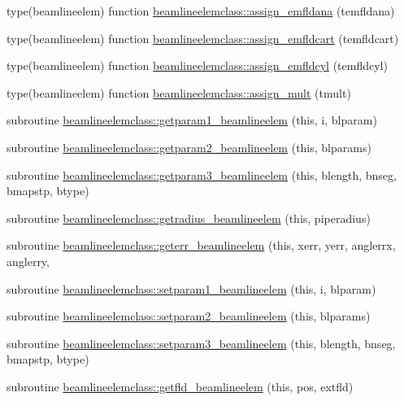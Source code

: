 \begin{DoxyCompactItemize}
\item 
type(beamlineelem) function \mbox{\hyperlink{namespacebeamlineelemclass_a2cd5ca28bafb3c67cde6af5b0677473f}{beamlineelemclass\+::assign\+\_\+emfldana}} (temfldana)
\item 
type(beamlineelem) function \mbox{\hyperlink{namespacebeamlineelemclass_af51b4befb67d269a6d71be8bbd50399b}{beamlineelemclass\+::assign\+\_\+emfldcart}} (temfldcart)
\item 
type(beamlineelem) function \mbox{\hyperlink{namespacebeamlineelemclass_a3d349f36feb9724cfcf498e03c191b29}{beamlineelemclass\+::assign\+\_\+emfldcyl}} (temfldcyl)
\item 
type(beamlineelem) function \mbox{\hyperlink{namespacebeamlineelemclass_aacf4de73999b66f3e37bf58cda6e562b}{beamlineelemclass\+::assign\+\_\+mult}} (tmult)
\item 
subroutine \mbox{\hyperlink{namespacebeamlineelemclass_a52595a459a442685b5ab427a2fdb27c8}{beamlineelemclass\+::getparam1\+\_\+beamlineelem}} (this, i, blparam)
\item 
subroutine \mbox{\hyperlink{namespacebeamlineelemclass_ab0803e0260eb5f57a59a7d1f70cf7050}{beamlineelemclass\+::getparam2\+\_\+beamlineelem}} (this, blparams)
\item 
subroutine \mbox{\hyperlink{namespacebeamlineelemclass_a0b69da010861c6ca72da3822335a7b2f}{beamlineelemclass\+::getparam3\+\_\+beamlineelem}} (this, blength, bnseg, bmapstp, btype)
\item 
subroutine \mbox{\hyperlink{namespacebeamlineelemclass_a1ad4e1512d472a585ab03dee9a2f1acb}{beamlineelemclass\+::getradius\+\_\+beamlineelem}} (this, piperadius)
\item 
subroutine \mbox{\hyperlink{namespacebeamlineelemclass_aa02696ccb3d6d48bfdcb0ff3ea906fa1}{beamlineelemclass\+::geterr\+\_\+beamlineelem}} (this, xerr, yerr, anglerrx, anglerry,
\item 
subroutine \mbox{\hyperlink{namespacebeamlineelemclass_a2475c641494686c9c9688a8b15975cbf}{beamlineelemclass\+::setparam1\+\_\+beamlineelem}} (this, i, blparam)
\item 
subroutine \mbox{\hyperlink{namespacebeamlineelemclass_a2ac6f016596ac46cf326e023cbb3f23b}{beamlineelemclass\+::setparam2\+\_\+beamlineelem}} (this, blparams)
\item 
subroutine \mbox{\hyperlink{namespacebeamlineelemclass_a604cc75bca5926a1918df8c19454e41e}{beamlineelemclass\+::setparam3\+\_\+beamlineelem}} (this, blength, bnseg, bmapstp, btype)
\item 
subroutine \mbox{\hyperlink{namespacebeamlineelemclass_a21fd373bab34a4c18c8bcf5b00816c0c}{beamlineelemclass\+::getfld\+\_\+beamlineelem}} (this, pos, extfld)

\end{DoxyCompactItemize}
